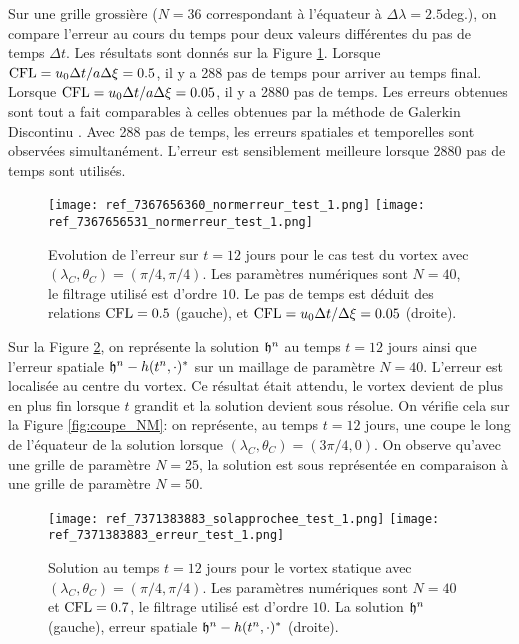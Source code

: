 Sur une grille grossière ($N=36$ correspondant à l'équateur à $\Delta \lambda = 2.5$deg.), on compare l'erreur au cours du temps pour deux valeurs différentes du pas de temps $\Delta t$. Les résultats sont donnés sur la Figure \ref{fig:cfl_NM}. Lorsque $\text{CFL} = u_0 \Delta t / a \Delta \xi = 0.5$, il y a 288 pas de temps pour arriver au temps final. Lorsque $\text{CFL} = u_0 \Delta t / a \Delta \xi = 0.05$, il y a 2880 pas de temps. Les erreurs obtenues sont tout a fait comparables à celles obtenues par la méthode de Galerkin Discontinu \cite{Nair2008}. Avec 288 pas de temps, les erreurs spatiales et temporelles sont observées simultanément. L'erreur est sensiblement meilleure lorsque 2880 pas de temps sont utilisés.

\begin{figure}[htbp]
\begin{center}
\texttt{[image: ref\_7367656360\_normerreur\_test\_1.png]}
\texttt{[image: ref\_7367656531\_normerreur\_test\_1.png]}
\end{center}
\caption{Evolution de l'erreur sur $t=12$ jours pour le cas test du vortex \cite{Nair2002} avec $(\lambda_C, \theta_C) = (\pi/4, \pi/4)$. Les paramètres numériques sont $N=40$, le filtrage utilisé est d'ordre $10$. Le pas de temps est déduit des relations $\text{CFL} = 0.5$ (gauche), et $\text{CFL} = u_0 \Delta t / \Delta \xi = 0.05$ (droite).}
\label{fig:cfl_NM}
\end{figure}

Sur la Figure \ref{fig:space_NM}, on représente la solution $\mathfrak{h}^n$ au temps $t=12$ jours ainsi que l'erreur spatiale $\mathfrak{h}^n-h(t^n,\cdot)^*$ sur un maillage de paramètre $N=40$. L'erreur est localisée au centre du vortex. Ce résultat était attendu, le vortex devient de plus en plus fin lorsque $t$ grandit et la solution devient sous résolue. 
On vérifie cela sur la Figure \ref{fig:coupe_NM}: on représente, au temps $t=12$ jours, une coupe le long de l'équateur de la solution lorsque $(\lambda_C, \theta_C)=(3 \pi/4,0)$. On observe qu'avec une grille de paramètre $N=25$, la solution est sous représentée en comparaison à une grille de paramètre $N=50$.

\begin{figure}[htbp]
\begin{center}
\texttt{[image: ref\_7371383883\_solapprochee\_test\_1.png]}
\texttt{[image: ref\_7371383883\_erreur\_test\_1.png]}
\end{center}
\caption{Solution au temps $t=12$ jours pour le vortex statique \cite{Nair2002} avec $(\lambda_C, \theta_C) = (\pi/4, \pi/4)$. Les paramètres numériques sont $N=40$ et $\text{CFL} = 0.7$, le filtrage utilisé est d'ordre $10$. La solution $\mathfrak{h}^n$ (gauche), erreur spatiale $\mathfrak{h}^n - h(t^n,\cdot)^*$ (droite).}
\label{fig:space_NM}
\end{figure}

